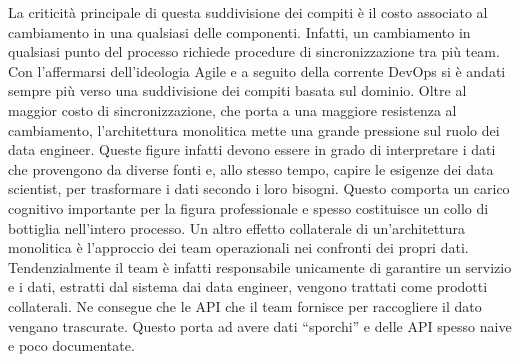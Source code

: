 \documentclass[a4paper,12pt]{report}
\begin{document}
La criticità principale di questa suddivisione dei compiti è il costo associato al cambiamento in una qualsiasi delle componenti. 
Infatti, un cambiamento in qualsiasi punto del processo richiede procedure di sincronizzazione tra più team.
Con l'affermarsi dell'ideologia Agile \cite{fowler2001agile} e a seguito della corrente DevOps si è andati sempre più verso una suddivisione dei compiti basata sul dominio. 
Oltre al maggior costo di sincronizzazione, che porta a una maggiore resistenza al cambiamento, l'architettura monolitica mette una grande pressione sul ruolo dei data engineer.
Queste figure infatti devono essere in grado di interpretare i dati che provengono da diverse fonti e, allo stesso tempo, capire le esigenze dei data scientist, per trasformare i dati secondo i loro bisogni. 
Questo comporta un carico cognitivo importante per la figura professionale e spesso costituisce un collo di bottiglia nell'intero processo.
Un altro effetto collaterale di un'architettura monolitica è l'approccio dei team operazionali nei confronti dei propri dati.  
Tendenzialmente il team è infatti responsabile unicamente di garantire un servizio e i dati, estratti dal sistema dai data engineer, vengono trattati come prodotti collaterali. 
Ne consegue che le API che il team fornisce per raccogliere il dato vengano trascurate. 
Questo porta ad avere dati ``sporchi'' e delle API spesso naive e poco documentate.
\end{document}
